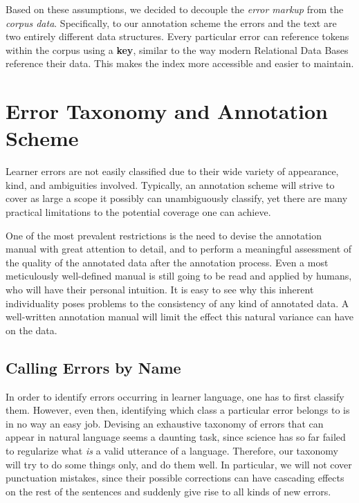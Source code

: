 \documentclass[12pt]{article}
\begin{document}
Based on these assumptions, we decided to decouple the \textit{error markup}
from the \textit{corpus data}. Specifically, to our annotation scheme the
errors and the text are two entirely different data structures. Every
particular error can reference tokens within the corpus using a \textbf{key},
similar to the way modern Relational Data Bases reference their data. This makes
the index more accessible and easier to maintain.

\section{Error Taxonomy and Annotation Scheme}\label{sec:scheme}

Learner errors are not easily classified due to their wide variety of
appearance, kind, and ambiguities involved. Typically, an annotation scheme will
strive to cover as large a scope it possibly can unambiguously classify, yet
there are many practical limitations to the potential coverage one can achieve.

One of the most prevalent restrictions is the need to devise the annotation
manual with great attention to detail, and to perform a meaningful assessment of
the quality of the annotated data after the annotation process. Even a most
meticulously well-defined manual is still going to be read and applied by
humans, who will have their personal intuition. It is easy to see
why this inherent individuality poses problems to the consistency of any kind of
annotated data. A well-written annotation manual will limit the effect this
natural variance can have on the data.

\subsection{Calling Errors by Name}\label{sec:taxonomy}

In order to identify errors occurring in learner language, one has to first
classify them. However, even then, identifying which class a particular error
belongs to is in no way an easy job. Devising an exhaustive taxonomy of errors
that can appear in natural language seems a daunting task, since science has so
far failed to regularize what \textit{is} a valid utterance of a language.
Therefore, our taxonomy will try to do some things only, and do them well. In
particular, we will not cover punctuation mistakes, since their possible
corrections can have cascading effects on the rest of the sentences and suddenly
give rise to all kinds of new errors.
\end{document}
